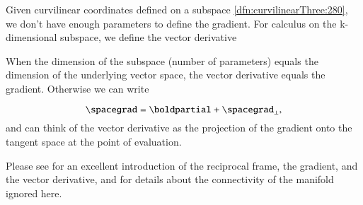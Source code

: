 %
%

Given curvilinear coordinates defined on a subspace \cref{dfn:curvilinearThree:280}, we don't have enough parameters to define the gradient.  For calculus on the k-dimensional subspace, we define the vector derivative


When the dimension of the subspace (number of parameters) equals the dimension of the underlying vector space, the vector derivative equals the gradient.  Otherwise we can write

\begin{dmath}\label{eqn:vectorDerivative:101}
\spacegrad = \boldpartial + \spacegrad_\perp,
\end{dmath}
and can think of the vector derivative as the projection of the gradient onto the tangent space at the point of evaluation.

Please see \citep{aMacdonaldVAGC} for an excellent introduction of the reciprocal frame, the gradient, and the vector derivative, and for
details about the connectivity of the manifold ignored here.

